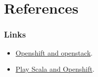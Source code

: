 \documentclass[bigger]{beamer}
\begin{document}
\section{References}
\label{sec-3}
\begin{frame}
\frametitle{Links}
\label{sec-3-1}


\begin{itemize}
\item \href{http://www.slideshare.net/fallenpegasus/openshift-openstack-fedora-awesome}{Openshift and openstack}.
\item \hyperref[ttp-www.slideshare.net-jdewinne-cloud-development-using-play-scala-and-openshift]{Play Scala and Openshift}.
\end{itemize}
\end{frame}
\end{document}
